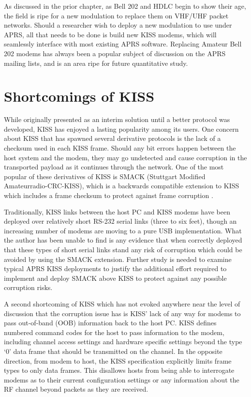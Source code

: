 As discussed in the prior chapter,
as Bell 202 and HDLC begin to show their age, the field is ripe for a new
modulation to replace them on VHF/UHF packet networks.
Should a researcher wish to deploy a new modulation to use under APRS,
all that needs to be done is build new KISS modems, which will seamlessly
interface with most existing APRS software.
Replacing Amateur Bell 202 modems has always been a popular subject of
discussion on the APRS mailing lists, and is an area ripe for future
quantitative study.

\section{Shortcomings of KISS}

While originally presented as an interim solution until a better protocol was
developed, KISS has enjoyed a lasting popularity among its users.
One concern about KISS that has spawned several derivative protocols is the
lack of a checksum used in each KISS frame.
Should any bit errors happen between the host system and the modem,
they may go undetected and cause corruption in the transported payload
as it continues through the network.
One of the most popular of these derivatives of KISS is SMACK (Stuttgart Modified
Amateurradio-CRC-KISS), which is a backwards compatible extension to KISS
which includes a frame checksum to protect against frame corruption \cite{smack}.

Traditionally, KISS links between the host PC and KISS modems have been deployed
over relatively short RS-232 serial links (three to six feet),
though an increasing number of modems are moving to a pure USB implementation.
What the author has been unable to find is any evidence that when correctly
deployed that these types of short serial links stand any risk of corruption
which could be avoided by using the SMACK extension.
Further study is needed to examine typical APRS KISS deployments to justify
the additional effort required to implement and deploy SMACK above KISS to
protect against any possible corruption risks.

A second shortcoming of KISS which has not evoked anywhere near the
level of discussion that the corruption issue has is KISS' lack of any way
for modems to pass out-of-band (OOB) information back to the host PC.
KISS defines numbered command codes for the host to pass information to the
modem, including channel access settings and hardware specific settings
beyond the type `0' data frame that should be transmitted on the channel.
In the opposite direction, from modem to host, the KISS specification explicitly
limits frame types to only data frames.
This disallows hosts from being able to interrogate modems as to their
current configuration settings or any information about the RF channel
beyond packets as they are received.

